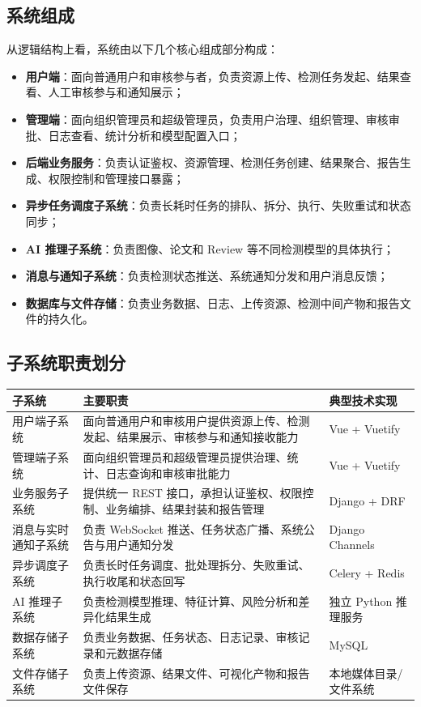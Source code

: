 \subsection{系统组成}
从逻辑结构上看，系统由以下几个核心组成部分构成：
\begin{itemize}[leftmargin=2em]
    \item \textbf{用户端}：面向普通用户和审核参与者，负责资源上传、检测任务发起、结果查看、人工审核参与和通知展示；
    \item \textbf{管理端}：面向组织管理员和超级管理员，负责用户治理、组织管理、审核审批、日志查看、统计分析和模型配置入口；
    \item \textbf{后端业务服务}：负责认证鉴权、资源管理、检测任务创建、结果聚合、报告生成、权限控制和管理接口暴露；
    \item \textbf{异步任务调度子系统}：负责长耗时任务的排队、拆分、执行、失败重试和状态同步；
    \item \textbf{AI 推理子系统}：负责图像、论文和 Review 等不同检测模型的具体执行；
    \item \textbf{消息与通知子系统}：负责检测状态推送、系统通知分发和用户消息反馈；
    \item \textbf{数据库与文件存储}：负责业务数据、日志、上传资源、检测中间产物和报告文件的持久化。
\end{itemize}

\subsection{子系统职责划分}
\begin{longtable}{|p{3.5cm}|p{9.3cm}|p{2.2cm}|}
\hline
子系统 & 主要职责 & 典型技术实现 \\ \hline
用户端子系统 & 面向普通用户和审核用户提供资源上传、检测发起、结果展示、审核参与和通知接收能力 & Vue + Vuetify \\ \hline
管理端子系统 & 面向组织管理员和超级管理员提供治理、统计、日志查询和审核审批能力 & Vue + Vuetify \\ \hline
业务服务子系统 & 提供统一 REST 接口，承担认证鉴权、权限控制、业务编排、结果封装和报告管理 & Django + DRF \\ \hline
消息与实时通知子系统 & 负责 WebSocket 推送、任务状态广播、系统公告与用户通知分发 & Django Channels \\ \hline
异步调度子系统 & 负责长时任务调度、批处理拆分、失败重试、执行收尾和状态回写 & Celery + Redis \\ \hline
AI 推理子系统 & 负责检测模型推理、特征计算、风险分析和差异化结果生成 & 独立 Python 推理服务 \\ \hline
数据存储子系统 & 负责业务数据、任务状态、日志记录、审核记录和元数据存储 & MySQL \\ \hline
文件存储子系统 & 负责上传资源、结果文件、可视化产物和报告文件保存 & 本地媒体目录/文件系统 \\ \hline
\end{longtable}

